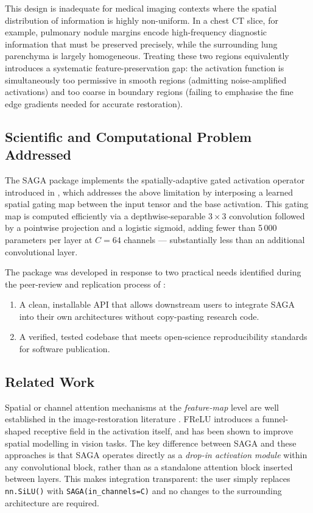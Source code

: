 \documentclass[preprint,12pt]{elsarticle}
\begin{document}
This design is inadequate for medical imaging contexts where the spatial
distribution of information is highly non-uniform.
In a chest CT slice, for example, pulmonary nodule margins encode
high-frequency diagnostic information that must be preserved precisely,
while the surrounding lung parenchyma is largely homogeneous.
Treating these two regions equivalently introduces a systematic
feature-preservation gap: the activation function is simultaneously
too permissive in smooth regions (admitting noise-amplified
activations) and too coarse in boundary regions (failing to emphasise
the fine edge gradients needed for accurate restoration).

\subsection{Scientific and Computational Problem Addressed}

The SAGA package implements the spatially-adaptive gated activation
operator introduced in \cite{siju2026saga}, which addresses the above
limitation by interposing a learned spatial gating map between the
input tensor and the base activation.
This gating map is computed efficiently via a depthwise-separable
$3 \times 3$ convolution followed by a pointwise projection and a
logistic sigmoid, adding fewer than 5\,000 parameters per layer at
$C = 64$ channels — substantially less than an additional convolutional
layer.

The package was developed in response to two practical needs identified
during the peer-review and replication process of \cite{siju2026saga}:
\begin{enumerate}
  \item A clean, installable API that allows downstream users to integrate
        SAGA into their own architectures without copy-pasting research code.
  \item A verified, tested codebase that meets open-science reproducibility
        standards for software publication.
\end{enumerate}

\subsection{Related Work}

Spatial or channel attention mechanisms at the \emph{feature-map} level are
well established in the image-restoration literature
\cite{hu2018squeeze,woo2018cbam,zamir2022restormer}.
FReLU \cite{ma2020funnel} introduces a funnel-shaped receptive field in the
activation itself, and has been shown to improve spatial modelling in vision
tasks.
The key difference between SAGA and these approaches is that SAGA operates
directly as a \emph{drop-in activation module} within any convolutional block,
rather than as a standalone attention block inserted between layers.
This makes integration transparent: the user simply replaces
\texttt{nn.SiLU()} with \texttt{SAGA(in\_channels=C)} and no changes to the
surrounding architecture are required.
\end{document}
